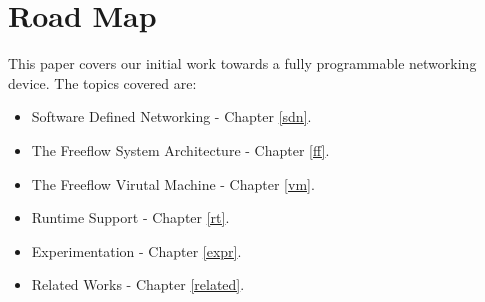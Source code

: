 \section{Road Map}
This paper covers our initial work towards a fully programmable networking device. The topics covered are:
\begin{itemize}
\item Software Defined Networking - Chapter \ref{sdn}.
\item The Freeflow System Architecture - Chapter \ref{ff}.
\item The Freeflow Virutal Machine - Chapter \ref{vm}.
\item Runtime Support - Chapter \ref{rt}.
\item Experimentation - Chapter \ref{expr}.
\item Related Works - Chapter \ref{related}.
\end{itemize}